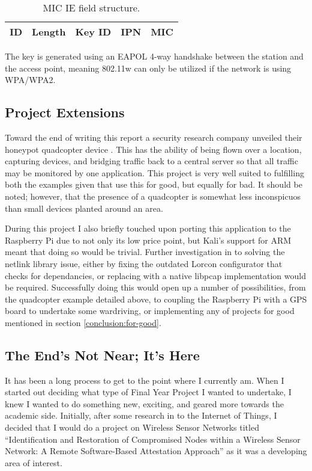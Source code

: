 \begin{table}[h!]
\begin{center}
	\begin{tabular}{|  p{2cm} |  p{2cm} | p{2cm} | p{2cm} | p{2cm} |}
		\hline
		ID & Length & Key ID & IPN & MIC\\ 
		\hline
	\end{tabular}
\end{center}
\caption{MIC IE field structure.}
\label{tbl:mic}
\end{table}

The key is generated using an EAPOL 4-way handshake between the station and the access point, meaning 802.11w can only be utilized if the network is using WPA/WPA2.

\subsection{Project Extensions}

Toward the end of writing this report a security research company unveiled their honeypot quadcopter device \cite{conc:snoopy}. This has the ability of being flown over a location, capturing devices, and bridging traffic back to a central server so that all traffic may be monitored by one application. This project is very well suited to fulfilling both the examples given that use this for good, but equally for bad. It should be noted; however, that the presence of a quadcopter is somewhat less inconspicuos than small devices planted around an area. 

During this project I also briefly touched upon porting this application to the Raspberry Pi due to not only its low price point, but Kali's support for ARM meant that doing so would be trivial. Further investigation in to solving the netlink library issue, either by fixing the outdated Lorcon configurator that checks for dependancies, or replacing with a native libpcap implementation would be required. Successfully doing this would open up a number of possibilities, from the quadcopter example detailed above, to coupling the Raspberry Pi with a GPS board to undertake some wardriving, or implementing any of projects for good mentioned in section \ref{conclusion:for-good}.
\newpage
\subsection{The End's Not Near; It's Here}
It has been a long process to get to the point where I currently am. When I started out deciding what type of Final Year Project I wanted to undertake, I knew I wanted to do something new, exciting, and geared more towards the academic side. Initially, after some research in to the Internet of Things, I decided that I would do a project on Wireless Sensor Networks titled ``Identification and Restoration of Compromised Nodes within a Wireless Sensor Network: A Remote Software-Based Attestation Approach'' as it was a developing area of interest. 

